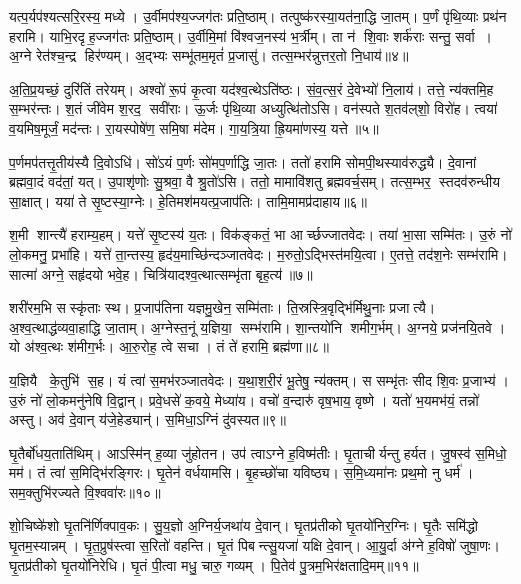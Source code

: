 यत्प॒र्यप॑श्यत्सरि॒रस्य॒ मध्ये।
उ॒र्वीमप॑श्य॒ज्जग॑तः प्रति॒ष्ठाम्।
तत्पुष्क॑रस्या॒यत॑ना॒द्धि जा॒तम्।
प॒र्णं पृ॑थि॒व्याः प्रथ॑न हरामि।
याभि॒रदृह॒ज्जग॑तः प्रति॒ष्ठाम्।
उ॒र्वीमि॒मां वि॑श्वज॒नस्य॑ भ॒र्त्रीम्।
ता न॑ शि॒वाः शर्क॑राः सन्तु॒ सर्वा।
अ॒ग्ने रेत॑श्च॒न्द्र हिर॑ण्यम्।
अ॒द्भ्यः सम्भू॑तम॒मृतं॑ प्र॒जासु॑।
तत्स॒म्भर॑न्नुत्तर॒तो नि॒धाय॑॥४॥

अ॒ति॒प्र॒यच्छं॒ दुरि॑तिं तरेयम्।
अश्वो॑ रू॒पं कृ॒त्वा यद॑श्व॒त्थेऽति॑ष्ठः।
सं॒व॒त्स॒रं दे॒वेभ्यो॑ नि॒लाय॑।
तत्ते॒ न्य॑क्तमि॒ह स॒म्भर॑न्तः।
श॒तं जी॑वेम श॒रद॒ सवी॑राः।
ऊ॒र्जः पृ॑थि॒व्या अध्युत्थि॑तोऽसि।
वन॑स्पते श॒तव॑ल्‌शो॒ विरो॑ह।
त्वया॑ व॒यमिष॒मूर्जं॒ मद॑न्तः।
रा॒यस्पोषे॑ण॒ समि॒षा म॑देम।
गा॒य॒त्रि॒या ह्रि॒यमा॑णस्य॒ यत्ते॥५॥

प॒र्णमप॑तत्तृ॒तीय॑स्यै दि॒वोऽधि॑।
सो॑ऽयं प॒र्णः सो॑मप॒र्णाद्धि जा॒तः।
ततो॑ हरामि सोमपी॒थस्याव॑रुद्ध्यै।
दे॒वानां ब्रह्मवा॒दं वद॑तां॒ यत्।
उ॒पाशृ॑णोः सु॒श्रवा॒ वै श्रु॒तो॑ऽसि।
ततो॒ मामावि॑शतु ब्रह्मवर्च॒सम्।
तत्स॒म्भर॒ स्तदव॑रुन्धीय सा॒क्षात्।
यया॑ ते सृ॒ष्टस्या॒ग्नेः।
हे॒तिमश॑मयत्प्र॒जाप॑तिः।
तामि॒मामप्र॑दाहाय॥६॥

श॒मी शान्त्यै॑ हराम्य॒हम्।
यत्ते॑ सृ॒ष्टस्य॑ य॒तः।
विक॑ङ्कतं॒ भा आर्च्छज्जातवेदः।
तया॑ भा॒सा सम्मि॑तः।
उ॒रुं नो॑ लो॒कमनु॒ प्रभा॑हि।
यत्ते॑ ता॒न्तस्य॒ हृद॑य॒माच्छि॑न्दञ्जातवेदः।
म॒रुतो॒ऽद्भिस्त॑मयि॒त्वा।
ए॒तत्ते॒ तद॑श॒नेः सम्भ॑रामि।
सात्मा॑ अग्ने॒ सहृ॑दयो भवे॒ह।
चित्रि॑यादश्व॒त्थात्सम्भृ॑ता बृह॒त्य॑॥७॥

शरी॑रम॒भि सस्कृ॑ताः स्थ।
प्र॒जाप॑तिना यज्ञमु॒खेन॒ सम्मि॑ताः।
ति॒स्रस्त्रि॒वृद्भि॑र्मिथु॒नाः प्रजात्यै।
अ॒श्व॒त्थाद्ध॑व्य\-वा॒हाद्धि जा॒ताम्।
अ॒ग्नेस्त॒नूं य॒ज्ञिया॒ सम्भ॑रामि।
शा॒न्तयो॑नि शमीग॒र्भम्।
अ॒ग्नये॒ प्रज॑नयि॒तवे।
यो अ॑श्व॒त्थः श॑मीग॒र्भः।
आ॒रु॒रोह॒ त्वे सचा।
तं ते॑ हरामि॒ ब्रह्म॑णा॥८॥

य॒ज्ञियै के॒तुभि॑ स॒ह।
यं त्वा॑ स॒मभ॑रञ्जातवेदः।
य॒था॒श॒री॒रं भू॒तेषु॒ न्य॑क्तम्।
स सम्भृ॑तः सीद शि॒वः प्र॒जाभ्य॑।
उ॒रुं नो॑ लो॒कमनु॑नेषि वि॒द्वान्।
प्रवे॒धसे॑ क॒वये॒ मेध्या॑य।
वचो॑ व॒न्दारु॑ वृष॒भाय॒ वृष्णे।
यतो॑ भ॒यमभ॑यं॒ तन्नो॑ अस्तु।
अव॑ दे॒वान् य॑जे॒हेड्यान्॑।
स॒मिधा॒ऽग्निं दु॑वस्यत॥९॥

घृ॒तैर्बो॑धय॒ताति॑थिम्।
आऽस्मि॑न् ह॒व्या जु॑होतन।
उप॑ त्वाऽग्ने ह॒विष्म॑तीः।
घृ॒ताचीर्यन्तु हर्यत।
जु॒षस्व॑ स॒मिधो॒ मम॑।
तं त्वा॑ स॒मिद्भि॑रङ्गिरः।
घृ॒तेन॑ वर्धयामसि।
बृ॒हच्छो॑चा यविष्ठ्य।
स॒मि॒ध्यमा॑नः प्रथ॒मो नु धर्म॑।
सम॒क्तुभि॑रज्यते वि॒श्ववा॑रः॥१०॥

शो॒चिष्के॑शो घृ॒तनि॑र्णिक्पाव॒कः।
सु॒य॒ज्ञो अ॒ग्निर्य॒जथा॑य दे॒वान्।
घृ॒तप्र॑तीको घृ॒तयो॑निर॒ग्निः।
घृ॒तैः समि॑द्धो घृ॒तम॒स्यान्नम्।
घृ॒त॒प्रुष॑स्त्वा स॒रितो॑ वहन्ति।
घृ॒तं पिबन्त्सु॒यजा॑ यक्षि दे॒वान्।
आ॒यु॒र्दा अ॑ग्ने ह॒विषो॑ जुषा॒णः।
घृ॒तप्र॑तीको घृ॒तयो॑निरेधि।
घृ॒तं पी॒त्वा मधु॒ चारु॒ गव्यम्।
पि॒तेव॑ पु॒त्रम॒भिर॑क्षतादि॒मम्॥११॥

